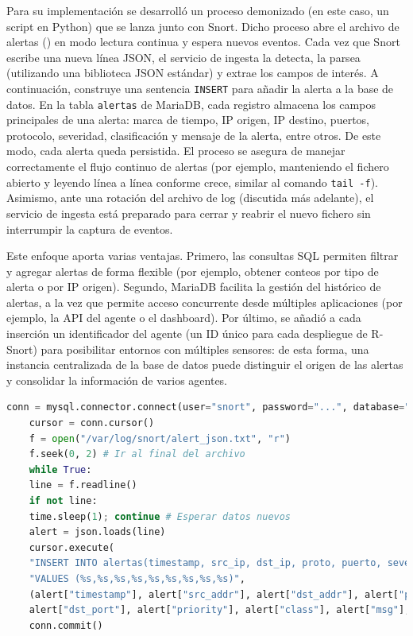\documentclass[11pt,a4paper,twoside]{report}
\begin{document}
Para su implementación se desarrolló un proceso demonizado (en este caso, un script en Python) que se lanza junto con Snort. Dicho proceso abre el archivo de alertas () en modo lectura continua y espera nuevos eventos. Cada vez que Snort escribe una nueva línea JSON, el servicio de ingesta la detecta, la parsea (utilizando una biblioteca JSON estándar) y extrae los campos de interés. A continuación, construye una sentencia \texttt{INSERT} para añadir la alerta a la base de datos. En la tabla \texttt{alertas} de MariaDB, cada registro almacena los campos principales de una alerta: marca de tiempo, IP origen, IP destino, puertos, protocolo, severidad, clasificación y mensaje de la alerta, entre otros. De este modo, cada alerta queda persistida. El proceso se asegura de manejar correctamente el flujo continuo de alertas (por ejemplo, manteniendo el fichero abierto y leyendo línea a línea conforme crece, similar al comando \texttt{tail -f}). Asimismo, ante una rotación del archivo de log (discutida más adelante), el servicio de ingesta está preparado para cerrar y reabrir el nuevo fichero sin interrumpir la captura de eventos.\newline

Este enfoque aporta varias ventajas. Primero, las consultas SQL permiten filtrar y agregar alertas de forma flexible (por ejemplo, obtener conteos por tipo de alerta o por IP origen). Segundo, MariaDB facilita la gestión del histórico de alertas, a la vez que permite acceso concurrente desde múltiples aplicaciones (por ejemplo, la API del agente o el dashboard). Por último, se añadió a cada inserción un identificador del agente (un ID único para cada despliegue de R-Snort) para posibilitar entornos con múltiples sensores: de esta forma, una instancia centralizada de la base de datos puede distinguir el origen de las alertas y consolidar la información de varios agentes.

\begin{lstlisting}[language=Python, caption={Esquema simplificado del servicio de ingesta de alertas}, label={lst:ingest}]
	conn = mysql.connector.connect(user="snort", password="...", database="snortDB") #Implementación real con variables de entorno
	cursor = conn.cursor()
	f = open("/var/log/snort/alert_json.txt", "r")
	f.seek(0, 2) # Ir al final del archivo
	while True:
	line = f.readline()
	if not line:
	time.sleep(1); continue # Esperar datos nuevos
	alert = json.loads(line)
	cursor.execute(
	"INSERT INTO alertas(timestamp, src_ip, dst_ip, proto, puerto, severidad, clase, mensaje, agente_id) "
	"VALUES (%s,%s,%s,%s,%s,%s,%s,%s,%s)",
	(alert["timestamp"], alert["src_addr"], alert["dst_addr"], alert["proto"],
	alert["dst_port"], alert["priority"], alert["class"], alert["msg"], AGENTE_ID))
	conn.commit()
\end{lstlisting}
\end{document}
